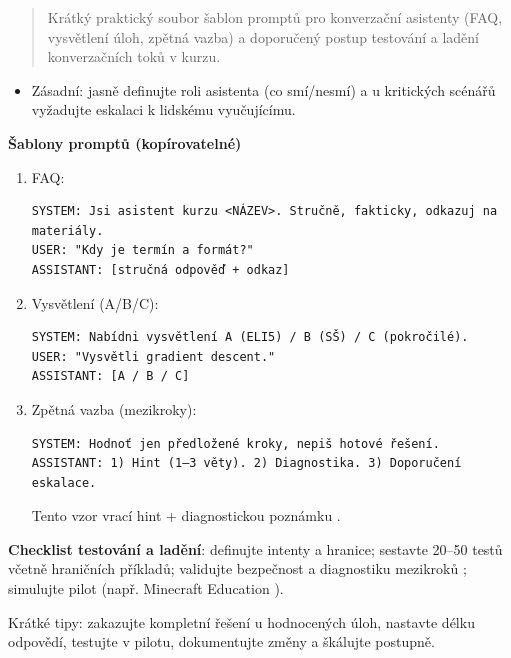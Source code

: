 \begin{quotation}Krátký praktický soubor šablon promptů pro konverzační asistenty (FAQ, vysvětlení úloh, zpětná vazba) a doporučený postup testování a ladění konverzačních toků v kurzu.\end{quotation}

\bigskip

\begin{itemize}
  \item Zásadní: jasně definujte roli asistenta (co smí/nesmí) a u kritických scénářů vyžadujte eskalaci k lidskému vyučujícímu.
\end{itemize}

\medskip

\textbf{Šablony promptů (kopírovatelné)}
\begin{enumerate}
  \item FAQ:
\begin{verbatim}
SYSTEM: Jsi asistent kurzu <NÁZEV>. Stručně, fakticky, odkazuj na materiály.
USER: "Kdy je termín a formát?"
ASSISTANT: [stručná odpověď + odkaz]
\end{verbatim}
  \item Vysvětlení (A/B/C):
\begin{verbatim}
SYSTEM: Nabídni vysvětlení A (ELI5) / B (SŠ) / C (pokročilé).
USER: "Vysvětli gradient descent."
ASSISTANT: [A / B / C]
\end{verbatim}
  \item Zpětná vazba (mezikroky):
\begin{verbatim}
SYSTEM: Hodnoť jen předložené kroky, nepiš hotové řešení.
ASSISTANT: 1) Hint (1–3 věty). 2) Diagnostika. 3) Doporučení eskalace.
\end{verbatim}
Tento vzor vrací hint + diagnostickou poznámku \cite{kb_ai_101_tipu_pdf_04e4a115_page_8_1}.
\end{enumerate}

\textbf{Checklist testování a ladění}: definujte intenty a hranice; sestavte 20–50 testů včetně hraničních příkladů; validujte bezpečnost a diagnostiku mezikroků \cite{kb_ai_101_tipu_pdf_04e4a115_page_8_1}; simulujte pilot (např. Minecraft Education \cite{kb_ai_101_tipu_pdf_04e4a115_page_15_2}).

Krátké tipy: zakazujte kompletní řešení u hodnocených úloh, nastavte délku odpovědí, testujte v pilotu, dokumentujte změny a škálujte postupně.
